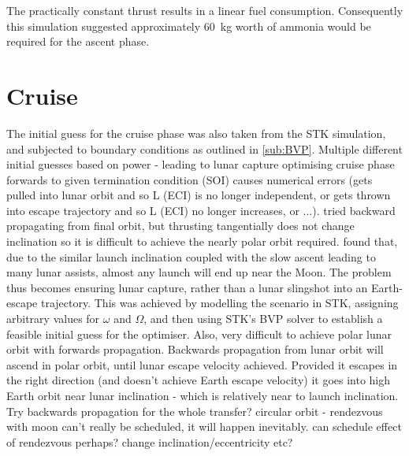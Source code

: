 The practically constant thrust results in a linear fuel consumption. Consequently this simulation suggested approximately 60~kg worth of ammonia would be required for the ascent phase. %

%


\clearpage

\section{Cruise}
The initial guess for the cruise phase was also taken from the STK simulation, and subjected to boundary conditions as outlined in \autoref{sub:BVP}.
Multiple different initial guesses based on power - leading to lunar capture
optimising cruise phase forwards to given termination condition (SOI) causes numerical errors (gets pulled into lunar orbit and so L (ECI) is no longer independent, or gets thrown into escape trajectory and so L (ECI) no longer increases, or ...).
tried backward propagating from final orbit, but thrusting tangentially does not change inclination so it is difficult to achieve the nearly polar orbit required.
found that, due to the similar launch inclination coupled with the slow ascent leading to many lunar assists, almost any launch will end up near the Moon. The problem thus becomes ensuring lunar capture, rather than a lunar slingshot into an Earth-escape trajectory. This was achieved by modelling the scenario in STK, assigning arbitrary values for $\omega$ and $\Omega$, and then using STK's BVP solver to establish a feasible initial guess for the optimiser. 
Also, very difficult to achieve polar lunar orbit with forwards propagation. Backwards propagation from lunar orbit will ascend in polar orbit, until lunar escape velocity achieved. Provided it escapes in the right direction (and doesn't achieve Earth escape velocity) it goes into high Earth orbit near lunar inclination - which is relatively near to launch inclination. Try backwards propagation for the whole transfer?
circular orbit - rendezvous with moon can't really be scheduled, it will happen inevitably. can schedule effect of rendezvous perhaps? change inclination/eccentricity etc?

